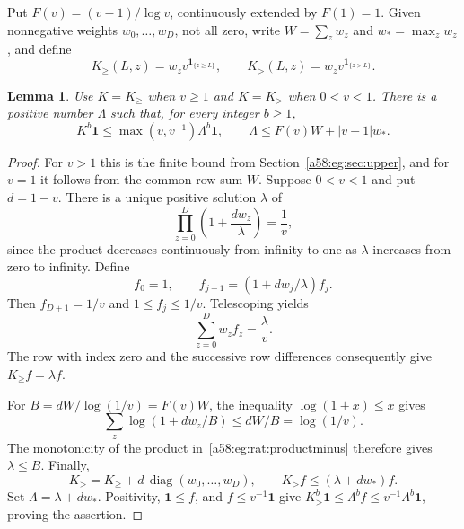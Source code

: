 \documentclass[11pt,letterpaper]{article}
\newtheorem{lemma}[theorem]{Lemma}
\theoremstyle{remark}
\newcommand{\ind}[1]{\mathbf1_{\{#1\}}}
\begin{document}
Put $F(v)=(v-1)/\log v$, continuously extended by $F(1)=1$. Given nonnegative weights $w_0,\ldots,w_D$, not all zero, write $W=\sum_z w_z$ and $w_*=\max_z w_z$, and define
\[
 K_\ge(L,z)=w_zv^{\ind{z\ge L}},\qquad
 K_>(L,z)=w_zv^{\ind{z>L}}.
\]
\begin{lemma}\label{a58:eg:rat:finite}
Use $K=K_\ge$ when $v\ge1$ and $K=K_>$ when $0<v<1$. There is a positive number $\Lambda$ such that, for every integer $b\ge1$,
\begin{equation}\label{a58:eg:rat:finitebound}
 K^b\mathbf1\le \max(v,v^{-1})\Lambda^b\mathbf1,
 \qquad
 \Lambda\le F(v)W+|v-1|w_*.
\end{equation}
\end{lemma}
\begin{proof}
For $v>1$ this is the finite bound from Section~\ref{a58:eg:sec:upper}, and for $v=1$ it follows from the common row sum $W$. Suppose $0<v<1$ and put $d=1-v$. There is a unique positive solution $\lambda$ of
\begin{equation}\label{a58:eg:rat:productminus}
 \prod_{z=0}^D\left(1+\frac{dw_z}{\lambda}\right)=\frac1v,
\end{equation}
since the product decreases continuously from infinity to one as $\lambda$ increases from zero to infinity. Define
\[
 f_0=1,\qquad f_{j+1}=(1+dw_j/\lambda)f_j.
\]
Then $f_{D+1}=1/v$ and $1\le f_j\le1/v$. Telescoping yields
\[
 \sum_{z=0}^D w_zf_z=\frac\lambda v.
\]
The row with index zero and the successive row differences consequently give $K_\ge f=\lambda f$.

For $B=dW/\log(1/v)=F(v)W$, the inequality $\log(1+x)\le x$ gives
\[
 \sum_z\log(1+dw_z/B)\le dW/B=\log(1/v).
\]
The monotonicity of the product in~\eqref{a58:eg:rat:productminus} therefore gives $\lambda\le B$. Finally,
\[
 K_>=K_\ge+d\,\operatorname{diag}(w_0,\ldots,w_D),
 \qquad K_>f\le(\lambda+dw_*)f.
\]
Set $\Lambda=\lambda+dw_*$. Positivity, $\mathbf1\le f$, and $f\le v^{-1}\mathbf1$ give
$K_>^b\mathbf1\le\Lambda^bf\le v^{-1}\Lambda^b\mathbf1$, proving the assertion.
\end{proof}
\end{document}
